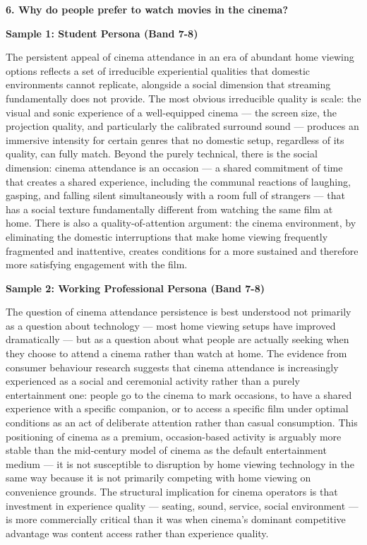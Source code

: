 \separator

\begin{ieltsquestion}
\textbf{6. Why do people prefer to watch movies in the cinema?}
\end{ieltsquestion}
\textbf{Sample 1: Student Persona (Band 7-8)}

The persistent appeal of cinema attendance in an era of abundant home viewing options reflects a set of irreducible experiential qualities that domestic environments cannot replicate, alongside a social dimension that streaming fundamentally does not provide. The most obvious irreducible quality is scale: the visual and sonic experience of a well-equipped cinema — the screen size, the projection quality, and particularly the calibrated surround sound — produces an immersive intensity for certain genres that no domestic setup, regardless of its quality, can fully match. Beyond the purely technical, there is the social dimension: cinema attendance is an occasion — a shared commitment of time that creates a shared experience, including the communal reactions of laughing, gasping, and falling silent simultaneously with a room full of strangers — that has a social texture fundamentally different from watching the same film at home. There is also a quality-of-attention argument: the cinema environment, by eliminating the domestic interruptions that make home viewing frequently fragmented and inattentive, creates conditions for a more sustained and therefore more satisfying engagement with the film.

\textbf{Sample 2: Working Professional Persona (Band 7-8)}

The question of cinema attendance persistence is best understood not primarily as a question about technology — most home viewing setups have improved dramatically — but as a question about what people are actually seeking when they choose to attend a cinema rather than watch at home. The evidence from consumer behaviour research suggests that cinema attendance is increasingly experienced as a social and ceremonial activity rather than a purely entertainment one: people go to the cinema to mark occasions, to have a shared experience with a specific companion, or to access a specific film under optimal conditions as an act of deliberate attention rather than casual consumption. This positioning of cinema as a premium, occasion-based activity is arguably more stable than the mid-century model of cinema as the default entertainment medium — it is not susceptible to disruption by home viewing technology in the same way because it is not primarily competing with home viewing on convenience grounds. The structural implication for cinema operators is that investment in experience quality — seating, sound, service, social environment — is more commercially critical than it was when cinema's dominant competitive advantage was content access rather than experience quality.

